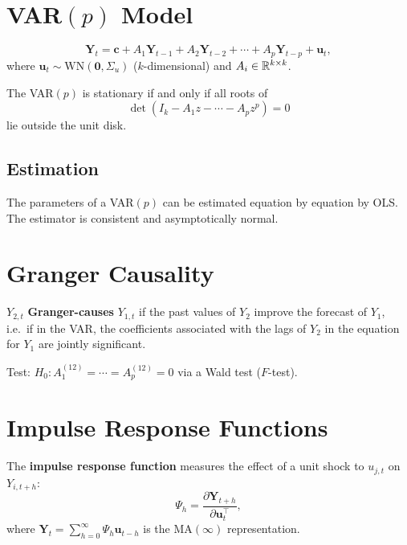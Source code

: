 \section{VAR$(p)$ Model}

\begin{definition}[VAR$(p)$]
\[
\bm{Y}_t = \bm{c} + A_1\bm{Y}_{t-1} + A_2\bm{Y}_{t-2} + \cdots + A_p\bm{Y}_{t-p} + \bm{u}_t,
\]
where $\bm{u}_t\sim\mathrm{WN}(\bm{0},\Sigma_u)$ ($k$-dimensional) and $A_i\in\mathbb{R}^{k\times k}$.
\end{definition}

\begin{theorem}
The VAR$(p)$ is stationary if and only if all roots of
\[
\det(I_k - A_1 z - \cdots - A_p z^p) = 0
\]
lie outside the unit disk.
\end{theorem}

\subsection{Estimation}

\begin{theorem}
The parameters of a VAR$(p)$ can be estimated equation by equation by OLS. The estimator is consistent and asymptotically normal.
\end{theorem}

\section{Granger Causality}

\begin{definition}
$Y_{2,t}$ \textbf{Granger-causes} $Y_{1,t}$ if the past values of $Y_2$ improve the forecast of $Y_1$, i.e.\ if in the VAR, the coefficients associated with the lags of $Y_2$ in the equation for $Y_1$ are jointly significant.

Test: $H_0 : A_1^{(12)}=\cdots=A_p^{(12)}=0$ via a Wald test ($F$-test).
\end{definition}

\section{Impulse Response Functions}

\begin{definition}[IRF]
The \textbf{impulse response function} measures the effect of a unit shock to $u_{j,t}$ on $Y_{i,t+h}$:
\[
\Psi_h = \frac{\partial\bm{Y}_{t+h}}{\partial\bm{u}_t^\top},
\]
where $\bm{Y}_t = \sum_{h=0}^{\infty}\Psi_h\bm{u}_{t-h}$ is the MA$(\infty)$ representation.
\end{definition}

